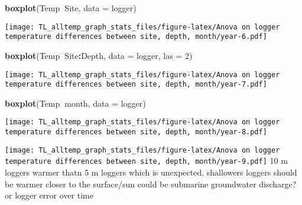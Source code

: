 \documentclass[
]{article}
\newenvironment{Shaded}{\begin{snugshade}}{\end{snugshade}}
\newcommand{\DataTypeTok}[1]{\textcolor[rgb]{0.13,0.29,0.53}{#1}}
\newcommand{\DecValTok}[1]{\textcolor[rgb]{0.00,0.00,0.81}{#1}}
\newcommand{\KeywordTok}[1]{\textcolor[rgb]{0.13,0.29,0.53}{\textbf{#1}}}
\newcommand{\NormalTok}[1]{#1}
\newcommand{\OperatorTok}[1]{\textcolor[rgb]{0.81,0.36,0.00}{\textbf{#1}}}
\newcommand{\StringTok}[1]{\textcolor[rgb]{0.31,0.60,0.02}{#1}}
\begin{document}
\begin{Shaded}
\begin{Highlighting}[]
\KeywordTok{boxplot}\NormalTok{(Temp}\OperatorTok{~}\NormalTok{Site, }\DataTypeTok{data =}\NormalTok{ logger)}
\end{Highlighting}
\end{Shaded}

\texttt{[image: TL\_alltemp\_graph\_stats\_files/figure-latex/Anova on logger temperature differences between site, depth, month/year-6.pdf]}

\begin{Shaded}
\begin{Highlighting}[]
\KeywordTok{boxplot}\NormalTok{(Temp}\OperatorTok{~}\NormalTok{Site}\OperatorTok{:}\NormalTok{Depth, }\DataTypeTok{data =}\NormalTok{ logger, }\DataTypeTok{las =} \DecValTok{2}\NormalTok{)}
\end{Highlighting}
\end{Shaded}

\texttt{[image: TL\_alltemp\_graph\_stats\_files/figure-latex/Anova on logger temperature differences between site, depth, month/year-7.pdf]}

\begin{Shaded}
\begin{Highlighting}[]
\KeywordTok{boxplot}\NormalTok{(Temp}\OperatorTok{~}\NormalTok{month, }\DataTypeTok{data =}\NormalTok{ logger)}
\end{Highlighting}
\end{Shaded}

\texttt{[image: TL\_alltemp\_graph\_stats\_files/figure-latex/Anova on logger temperature differences between site, depth, month/year-8.pdf]}

\begin{Shaded}
\end{Shaded}

\texttt{[image: TL\_alltemp\_graph\_stats\_files/figure-latex/Anova on logger temperature differences between site, depth, month/year-9.pdf]}
10 m loggers warmer thatn 5 m loggers which is unexpected, shallowers
loggers should be warmer closer to the surface/sun could be submarine
groundwater discharge? or logger error over time
\end{document}
